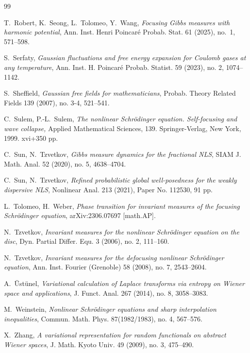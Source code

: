 \documentclass[letterpaper, 11pt,  reqno]{amsart}
\numberwithin{equation}{section}
\numberwithin{theorem}{section}
\begin{document}
\begin{thebibliography}{99}
	


	
	
	
T.~Robert, K.~Seong, L.~Tolomeo, Y.~Wang,
{\it Focusing Gibbs measures with harmonic potential}, Ann. Inst. Henri Poincar\'e{} Probab. Stat.  61 (2025), no.~1, 571--598.

	
S.~Serfaty,
{\it Gaussian fluctuations and free energy expansion for Coulomb gases at any temperature}, Ann. Inst. H. Poincar\'e Probab. Statist. 59 (2023), no. 2, 1074--1142.
	


S.~Sheffield, 
{\it Gaussian free fields for mathematicians},
Probab. Theory Related Fields 139 (2007), no. 3-4, 521--541. 


C.~Sulem, P.-L.~Sulem, 
{\it The nonlinear Schr\"odinger equation. Self-focusing and wave collapse,} Applied Mathematical Sciences, 139. Springer-Verlag, New York, 1999. xvi+350 pp. 



C.~Sun, N.~Tzvetkov,
{\it Gibbs measure dynamics for the fractional NLS},
SIAM J. Math. Anal. 52 (2020), no. 5, 4638--4704.
	
	
C.~Sun, N.~Tzvetkov,
{\it Refined probabilistic global well-posedness for the weakly dispersive NLS}, Nonlinear Anal. 213 (2021), Paper No. 112530, 91 pp.
	
L.~Tolomeo, H.~Weber,
{\it Phase transition for invariant measures of the focusing Schr\"odinger equation}, 
arXiv:2306.07697 [math.AP].


N.~Tzvetkov, 
{\it Invariant measures for the nonlinear Schr\"odinger equation on the disc}, 
 Dyn. Partial Differ. Equ. 3 (2006), no. 2, 111--160.


N.~Tzvetkov, 
{\it Invariant measures for the defocusing nonlinear Schr\"odinger equation}, 
 Ann. Inst. Fourier (Grenoble) 58 (2008), no. 7, 2543--2604.

	
A.~{\"U}st{\"u}nel,
{\it Variational calculation of Laplace transforms via entropy on Wiener space and applications},
{J. Funct. Anal.} 267 (2014), no. 8, 3058--3083.
	
M.~Weinstein, {\it Nonlinear Schrödinger equations and sharp interpolation inequalities}, Commun. Math. Phys. 87(1982/1983), no. 4, 567--576.
	
X.~Zhang, {\it A variational representation for random functionals on abstract Wiener spaces}, 
J. Math. Kyoto Univ. 49 (2009), no. 3, 475--490.
	
	
	
\end{thebibliography}
\end{document}
